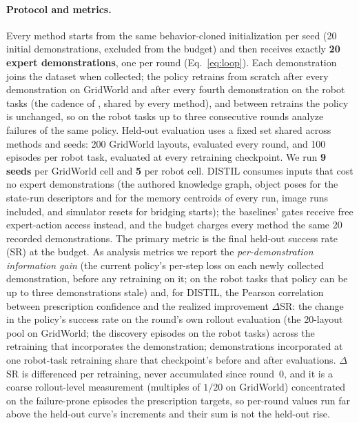 \documentclass[letterpaper]{article} %
\begin{document}
\paragraph{Protocol and metrics.}
Every method starts from the same behavior-cloned initialization per seed
(20 initial demonstrations, excluded from the budget) and then receives
exactly \textbf{20 expert demonstrations}, one per round
(Eq.~\ref{eq:loop}). Each demonstration joins the dataset when collected;
the policy retrains from scratch after every demonstration on GridWorld and
after every fourth demonstration on the robot tasks (the cadence of
\citealp{lee2025diffdagger}, shared by every method), and between retrains
the policy is unchanged, so on the robot tasks up to three consecutive
rounds analyze failures of the same policy. Held-out evaluation uses a
fixed set shared across methods and seeds: 200 GridWorld layouts, evaluated
every round, and 100 episodes per robot task, evaluated at every
retraining checkpoint. We run \textbf{9 seeds} per
GridWorld cell and \textbf{5} per robot cell. DISTIL consumes inputs that
cost no expert demonstrations (the authored knowledge graph, object poses
for the state-run descriptors and for the memory centroids of every run,
image runs included, and simulator resets for bridging starts); the
baselines' gates receive free expert-action access instead, and the budget
charges every method the same 20 recorded demonstrations.
The primary metric is the final held-out success
rate (SR) at the budget. As analysis metrics we report the
\emph{per-demonstration information gain} (the current policy's per-step
loss on each newly collected demonstration, before any retraining on it; on
the robot tasks that policy can be up to three demonstrations stale) and,
for DISTIL, the Pearson correlation between prescription confidence and the
realized improvement $\Delta$SR: the change in the policy's success rate on
the round's own rollout evaluation (the 20-layout pool on GridWorld; the
discovery episodes on the robot tasks) across the retraining that
incorporates the demonstration; demonstrations incorporated at one
robot-task retraining share that checkpoint's before and after evaluations.
$\Delta$SR is differenced per retraining, never accumulated
since round~0, and it is a coarse rollout-level measurement (multiples of
$1/20$ on GridWorld) concentrated on the failure-prone episodes the
prescription targets, so per-round values run far above the held-out
curve's increments and their sum is not the held-out rise.
\end{document}
